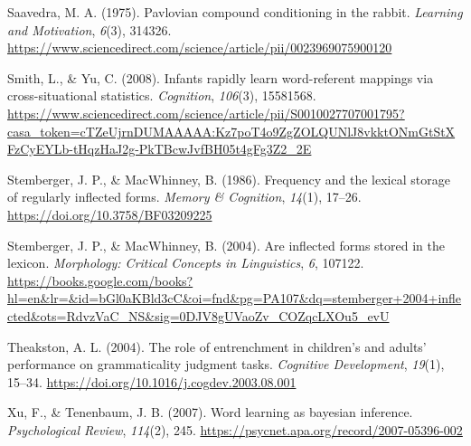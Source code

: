 \documentclass[
  letterpaper,
  DIV=11,
  numbers=noendperiod]{scrartcl}
\newlength{\cslhangindent}
\newenvironment{CSLReferences}[2] %
 {\begin{list}{}{%
  \setlength{\itemindent}{0pt}
  \setlength{\leftmargin}{0pt}
  \setlength{\parsep}{0pt}
  \ifodd #1
   \setlength{\leftmargin}{\cslhangindent}
   \setlength{\itemindent}{-1\cslhangindent}
  \fi
  \setlength{\itemsep}{#2\baselineskip}}}
 {\end{list}}
\begin{document}
\begin{CSLReferences}{1}{0}
Saavedra, M. A. (1975). Pavlovian compound conditioning in the rabbit.
\emph{Learning and Motivation}, \emph{6}(3), 314326.
\url{https://www.sciencedirect.com/science/article/pii/0023969075900120}

Smith, L., \& Yu, C. (2008). Infants rapidly learn word-referent
mappings via cross-situational statistics. \emph{Cognition},
\emph{106}(3), 15581568.
\url{https://www.sciencedirect.com/science/article/pii/S0010027707001795?casa_token=cTZeUjrnDUMAAAAA:Kz7poT4o9ZgZOLQUNlJ8vkktONmGtStXFzCyEYLb-tHqzHaJ2g-PkTBcwJvfBH05t4gFg3Z2_2E}

Stemberger, J. P., \& MacWhinney, B. (1986). Frequency and the lexical
storage of regularly inflected forms. \emph{Memory \& Cognition},
\emph{14}(1), 17--26. \url{https://doi.org/10.3758/BF03209225}

Stemberger, J. P., \& MacWhinney, B. (2004). Are inflected forms stored
in the lexicon. \emph{Morphology: Critical Concepts in Linguistics},
\emph{6}, 107122.
\url{https://books.google.com/books?hl=en&lr=&id=bGl0aKBld3cC&oi=fnd&pg=PA107&dq=stemberger+2004+inflected&ots=RdvzVaC_NS&sig=0DJV8gUVaoZv_COZqcLXOu5_evU}

Theakston, A. L. (2004). The role of entrenchment in children{'}s and
adults{'} performance on grammaticality judgment tasks. \emph{Cognitive
Development}, \emph{19}(1), 15--34.
\url{https://doi.org/10.1016/j.cogdev.2003.08.001}

Xu, F., \& Tenenbaum, J. B. (2007). Word learning as bayesian inference.
\emph{Psychological Review}, \emph{114}(2), 245.
\url{https://psycnet.apa.org/record/2007-05396-002}

\end{CSLReferences}
\end{document}
